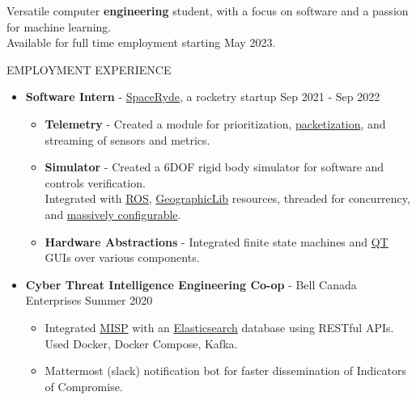 \documentclass{resume} %
\begin{document}
Versatile computer \textbf{engineering} student, with a focus on software and a passion for machine learning.\\
Available for full time employment starting May 2023.

\begin{rSection}{EMPLOYMENT EXPERIENCE}
    \begin{itemize}
        \item {\bf Software Intern} - \href{https://www.spaceryde.com/}{SpaceRyde}, a rocketry startup \hfill {Sep 2021 - Sep 2022}
        \begin{itemize}[noitemsep,topsep=-8pt]
            \item[\textbullet] {\bf Telemetry} - Created a module for prioritization, \href{http://libtins.github.io/}{packetization}, and streaming of sensors and metrics.
            \item[\textbullet] {\bf Simulator} - Created a 6DOF rigid body simulator for software and controls verification.\\
            Integrated with \href{https://docs.ros.org/en/foxy/Installation.html}{ROS}, \href{https://geographiclib.sourceforge.io/C++/doc/index.html}{GeographicLib} resources, threaded for concurrency, and \href{https://github.com/jbeder/yaml-cpp}{massively configurable}.
            \item[\textbullet] {\bf Hardware Abstractions} - Integrated finite state machines and \href{https://wiki.qt.io/Qt_for_Beginners}{QT} GUIs over various components. 
        \end{itemize}
        \item {\bf Cyber Threat Intelligence Engineering Co-op} - Bell Canada Enterprises \hfill {Summer 2020}
        \begin{itemize}[noitemsep,topsep=-8pt]
            \item[\textbullet] Integrated \href{https://www.misp-project.org/}{MISP} with an \href{https://www.elastic.co/what-is/elk-stack}{Elasticsearch} database using RESTful APIs.
            Used Docker, Docker Compose, Kafka.
            \item[\textbullet] Mattermost (slack) notification bot for faster dissemination of Indicators of Compromise.
        \end{itemize}
    \end{itemize}
\end{rSection}
\end{document}
